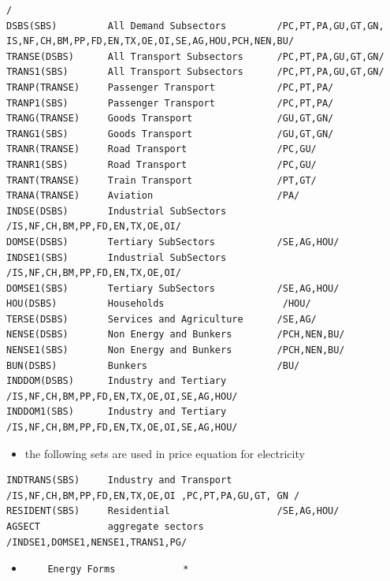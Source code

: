 \documentclass[a4paper,]{scrartcl}
\providecommand{\tightlist}{%
  \setlength{\itemsep}{0pt}\setlength{\parskip}{0pt}}
\begin{document}
\begin{lstlisting}
/
DSBS(SBS)         All Demand Subsectors         /PC,PT,PA,GU,GT,GN, IS,NF,CH,BM,PP,FD,EN,TX,OE,OI,SE,AG,HOU,PCH,NEN,BU/
TRANSE(DSBS)      All Transport Subsectors      /PC,PT,PA,GU,GT,GN/
TRANS1(SBS)       All Transport Subsectors      /PC,PT,PA,GU,GT,GN/
TRANP(TRANSE)     Passenger Transport           /PC,PT,PA/
TRANP1(SBS)       Passenger Transport           /PC,PT,PA/
TRANG(TRANSE)     Goods Transport               /GU,GT,GN/
TRANG1(SBS)       Goods Transport               /GU,GT,GN/
TRANR(TRANSE)     Road Transport                /PC,GU/
TRANR1(SBS)       Road Transport                /PC,GU/
TRANT(TRANSE)     Train Transport               /PT,GT/
TRANA(TRANSE)     Aviation                      /PA/
INDSE(DSBS)       Industrial SubSectors         /IS,NF,CH,BM,PP,FD,EN,TX,OE,OI/
DOMSE(DSBS)       Tertiary SubSectors           /SE,AG,HOU/
INDSE1(SBS)       Industrial SubSectors         /IS,NF,CH,BM,PP,FD,EN,TX,OE,OI/
DOMSE1(SBS)       Tertiary SubSectors           /SE,AG,HOU/
HOU(DSBS)         Households                     /HOU/
TERSE(DSBS)       Services and Agriculture      /SE,AG/
NENSE(DSBS)       Non Energy and Bunkers        /PCH,NEN,BU/
NENSE1(SBS)       Non Energy and Bunkers        /PCH,NEN,BU/
BUN(DSBS)         Bunkers                       /BU/
INDDOM(DSBS)      Industry and Tertiary         /IS,NF,CH,BM,PP,FD,EN,TX,OE,OI,SE,AG,HOU/
INDDOM1(SBS)      Industry and Tertiary         /IS,NF,CH,BM,PP,FD,EN,TX,OE,OI,SE,AG,HOU/
\end{lstlisting}

\begin{itemize}
\tightlist
\item
  the following sets are used in price equation for electricity
\end{itemize}

\begin{lstlisting}
INDTRANS(SBS)     Industry and Transport        /IS,NF,CH,BM,PP,FD,EN,TX,OE,OI ,PC,PT,PA,GU,GT, GN /
RESIDENT(SBS)     Residential                   /SE,AG,HOU/
AGSECT            aggregate sectors             /INDSE1,DOMSE1,NENSE1,TRANS1,PG/
\end{lstlisting}

\begin{itemize}
\item
\begin{lstlisting}
    Energy Forms            *
\end{lstlisting}
\end{itemize}
\end{document}
